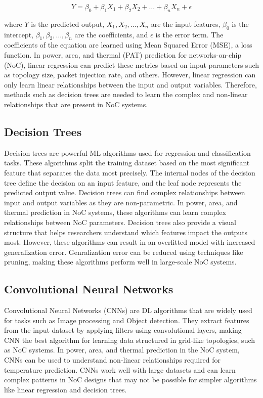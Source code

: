 \documentclass[conference]{IEEEtran}
\begin{document}
\[
Y = \beta_0 + \beta_1 X_1 + \beta_2 X_2 + \dots + \beta_n X_n + \epsilon
\]

where \( Y \) is the predicted output, \( X_1, X_2, \dots, X_n \) are the input features, \( \beta_0 \) is the intercept, \( \beta_1, \beta_2, \dots, \beta_n \) are the coefficients, and \( \epsilon \) is the error term. The coefficients of the equation are learned using Mean Squared Error (MSE), a loss function. In power, area, and thermal (PAT) prediction for networks-on-chip (NoC), linear regression can predict these metrics based on input parameters such as topology size, packet injection rate, and others. However, linear regression can only learn linear relationships between the input and output variables. Therefore, methods such as decision trees are needed to learn the complex and non-linear relationships that are present in NoC systems.

\subsection{Decision Trees}

Decision trees are powerful ML algorithms used for regression and classification tasks. These algorithms split the training dataset based on the most significant feature that separates the data most precisely. The internal nodes of the decision tree define the decision on an input feature, and the leaf node represents the predicted output value. Decision trees can find complex relationships between input and output variables as they are non-parametric. In power, area, and thermal prediction in NoC systems, these algorithms can learn complex relationships between NoC parameters. Decision trees also provide a visual structure that helps researchers understand which features impact the outputs most. However, these algorithms can result in an overfitted model with  increased generalization error. Genralization error can be reduced using techniques like pruning, making these algorithms perform well in large-scale NoC systems.

\subsection{Convolutional Neural Networks}

Convolutional Neural Networks (CNNs) are DL algorithms that are widely used for tasks such as Image processing and Object detection. They extract features from the input dataset by applying filters using convolutional layers, making CNN the best algorithm for learning data structured in grid-like topologies, such as NoC systems. In power, area, and thermal prediction in the NoC system, CNNs can be used to understand non-linear relationships required for temperature prediction. CNNs work well with large datasets and can learn complex patterns in NoC designs that may not be possible for simpler algorithms like linear regression and decision trees.
\end{document}

